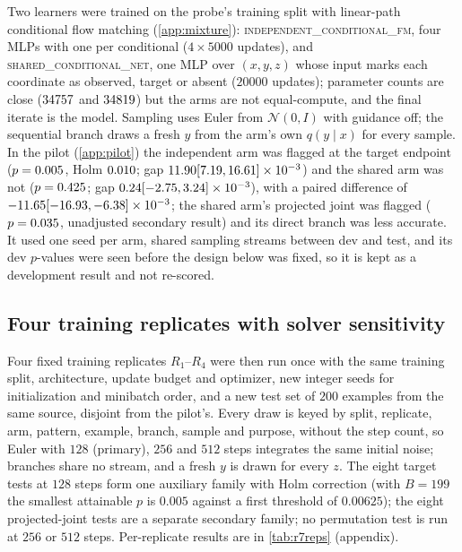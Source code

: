 \documentclass{article}
\theoremstyle{plain}
\theoremstyle{definition}
\theoremstyle{remark}
\begin{document}
Two learners were trained on the probe's training split with linear-path conditional flow matching (\cref{app:mixture}): \textsc{independent\_conditional\_fm}, four MLPs with one per conditional ($4\times5000$ updates), and \textsc{shared\_conditional\_net}, one MLP over $(x,y,z)$ whose input marks each coordinate as observed, target or absent ($20000$ updates); parameter counts are close ($34757$ and $34819$) but the arms are not equal-compute, and the final iterate is the model.
Sampling uses Euler from $\mathcal N(0,I)$ with guidance off; the sequential branch draws a fresh $y$ from the arm's own $q(y\mid x)$ for every sample.
In the pilot (\cref{app:pilot}) the independent arm was flagged at the target endpoint ($p=0.005$, Holm $0.010$; gap $11.90 [7.19, 16.61]\times10^{-3}$) and the shared arm was not ($p=0.425$; gap $0.24 [-2.75, 3.24]\times10^{-3}$), with a paired difference of $-11.65 [-16.93, -6.38]\times10^{-3}$; the shared arm's projected joint was flagged ($p=0.035$, unadjusted secondary result) and its direct branch was less accurate.
It used one seed per arm, shared sampling streams between dev and test, and its dev $p$-values were seen before the design below was fixed, so it is kept as a development result and not re-scored.

\subsection{Four training replicates with solver sensitivity}
\label{sec:exp-reps}
Four fixed training replicates $R_1$--$R_4$ were then run once with the same training split, architecture, update budget and optimizer, new integer seeds for initialization and minibatch order, and a new test set of $200$ examples from the same source, disjoint from the pilot's.
Every draw is keyed by split, replicate, arm, pattern, example, branch, sample and purpose, without the step count, so Euler with $128$ (primary), $256$ and $512$ steps integrates the same initial noise; branches share no stream, and a fresh $y$ is drawn for every $z$.
The eight target tests at $128$ steps form one auxiliary family with Holm correction (with $B=199$ the smallest attainable $p$ is $0.005$ against a first threshold of $0.00625$); the eight projected-joint tests are a separate secondary family; no permutation test is run at $256$ or $512$ steps. Per-replicate results are in \cref{tab:r7reps} (appendix).
\end{document}
